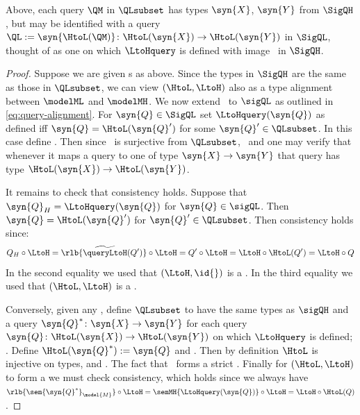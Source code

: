 \documentclass{article}
\begin{document}
{Above, each query $\QM$ in $\QLsubset$ has types $\syn{X}$, $\syn{Y}$ from $\SigQH$, but may be identified with a query $\QL := \syn{\HtoL(\QM)} \colon \HtoL(\syn{X}) \to \HtoL(\syn{Y})$ in $\SigQL$, thought of as one on which $\LtoHquery$ is defined with image \rlb{$\queryLtoH(\QL) := \widetilde{\queryLtoH}(\QM)$}\ in $\SigQH$. 

\begin{proof}
Suppose we are given \qdown{}s as above. Since the types in $\SigQH$ are the same as those in $\QLsubset$, we can view $(\HtoL, \LtoH)$ also as a type alignment between $\modelML$ and $\modelMH$. We now extend \rlb{$\widetilde{\queryLtoH}$}\ to $\sigQL$ as outlined in \eqref{eq:query-alignment}. For $\syn{Q} \in \SigQL$ set $\LtoHquery(\syn{Q})$ as defined iff $\syn{Q} = \HtoL(\syn{Q}')$ for some $\syn{Q}' \in \QLsubset$. In this case define . Then since \rlb{$\widetilde{\queryLtoH}$}\ is surjective from $\QLsubset$, \ and one may verify that whenever it maps a query to one of type $\syn{X} \to \syn{Y}$ that query has type $\HtoL(\syn{X}) \to \HtoL(\syn{Y})$. 

It remains to check that consistency holds. Suppose that $\syn{Q}_H = \LtoHquery(\syn{Q})$ for $\syn{Q} \in \sigQL$. Then $\syn{Q} = \HtoL(\syn{Q}')$ for $\syn{Q}' \in \QLsubset$. Then consistency holds since:
\[ 
Q_H \circ \LtoH = \rlb{\widetilde{\queryLtoH}(Q')} \circ \LtoH = Q' \circ \LtoH = \LtoH \circ \HtoL(Q') = \LtoH \circ Q
\]
In the second equality we used that $(\LtoH, \id{})$ is a .  
In the third equality we used that $(\HtoL, \LtoH)$ is a \qdown{}.

Conversely, given any \qup{}, define $\QLsubset$ to have the same types as $\sigQH$ and a query $\syn{Q}^* \colon \syn{X} \to \syn{Y}$ for each query $\syn{Q} \colon \HtoL(\syn{X}) \to \HtoL(\syn{Y})$ on which $\LtoHquery$ is defined; . 
Define $\HtoL(\syn{Q}^*) := \syn{Q}$ and . Then by definition $\HtoL$ is injective on types, and . 
The fact that \ forms a strict \qdown{}. Finally for $(\HtoL, \LtoH)$ to form a \qdown{} we must check consistency, which holds since we always have $\rlb{\sem{\syn{Q}^*}_{\model{M}}} \circ \LtoH = \semMH{\LtoHquery(\syn{Q})} \circ \LtoH = \LtoH \circ \HtoL(Q)$. 
\end{proof}

}
\end{document}

